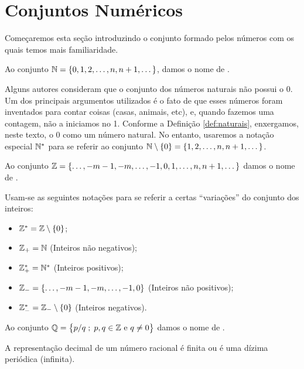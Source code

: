 \section{Conjuntos Numéricos}

Começaremos esta seção introduzindo o conjunto formado pelos números com os quais temos mais familiaridade.

\begin{definition}
\label{def:naturais}
Ao conjunto $\mathbb{N} = \left\{ 0, 1, 2, \dots , n, n+1, \dots\right\}$, damos o nome de .
\end{definition}

Alguns autores consideram que o conjunto dos números naturais não possui o 0.
Um dos principais argumentos utilizados é o fato de que esses números foram inventados para contar coisas (casas, animais, etc), e, quando fazemos uma contagem, não a iniciamos no 1.
Conforme a Definição \ref{def:naturais}, enxergamos, neste texto, o 0 como um número natural. No entanto, usaremos a notação especial $\mathbb{N}^*$ para se referir ao conjunto $\mathbb{N} \setminus \left\{ 0\right\} = \left\{ 1, 2, \dots, n, n+1, \dots\right\}$.


\begin{definition}
Ao conjunto $\mathbb{Z} =\left\{ \dots , -m -1, -m, \dots, -1, 0, 1,  \dots , n, n+1, \dots\right\}$ damos o nome de . 
\end{definition}

\noindent Usam-se as seguintes notações para se referir a certas ``variações'' do conjunto dos inteiros:

\begin{itemize}
	\item $\mathbb{Z}^\ast = \mathbb{Z} \setminus \left\{ 0\right\}$; 
	\item $\mathbb{Z}_+ = \mathbb{N}$ (Inteiros não negativos); 
	\item $\mathbb{Z}^\ast_+ =\mathbb{N} ^\ast$ (Inteiros positivos); 
	\item $\mathbb{Z}_- =\left\{ \dots , -m -1, -m, \dots, -1, 0\right\}$ (Inteiros não positivos); 
	\item $\mathbb{Z}_-^\ast =\mathbb{Z}_- \setminus \left\{ 0\right\}$ (Inteiros negativos).
\end{itemize}

\begin{definition}
Ao conjunto $\mathbb{Q} = \left\{ p/q \;;\; p, q \in \mathbb{Z} \text{ e } q \neq 0\right\}$ damos o nome de .
\end{definition}

\begin{remark}
A representação decimal de um número racional é finita ou é uma dízima periódica (infinita).
\end{remark}


